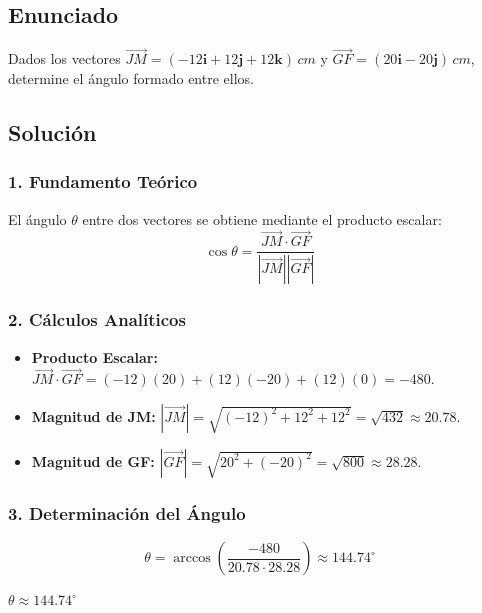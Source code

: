 \documentclass[12pt, a4paper]{article}
\begin{document}
\newpage

\subsection*{Enunciado}
Dados los vectores $\vec{JM} = (-12\mathbf{i} + 12\mathbf{j} + 12\mathbf{k}) \, \si{cm}$ y $\vec{GF} = (20\mathbf{i} - 20\mathbf{j}) \, \si{cm}$, determine el ángulo formado entre ellos.

\subsection*{Solución}

\subsubsection*{1. Fundamento Teórico}
El ángulo $\theta$ entre dos vectores se obtiene mediante el producto escalar:
\begin{equation*}
    \cos \theta = \frac{\vec{JM} \cdot \vec{GF}}{|\vec{JM}| |\vec{GF}|}
\end{equation*}

\subsubsection*{2. Cálculos Analíticos}
\begin{itemize}
    \item \textbf{Producto Escalar:} $\vec{JM} \cdot \vec{GF} = (-12)(20) + (12)(-20) + (12)(0) = -480$.
    \item \textbf{Magnitud de JM:} $|\vec{JM}| = \sqrt{(-12)^2 + 12^2 + 12^2} = \sqrt{432} \approx 20.78$.
    \item \textbf{Magnitud de GF:} $|\vec{GF}| = \sqrt{20^2 + (-20)^2} = \sqrt{800} \approx 28.28$.
\end{itemize}

\subsubsection*{3. Determinación del Ángulo}
\begin{equation*}
    \theta = \arccos\left( \frac{-480}{20.78 \cdot 28.28} \right) \approx 144.74^\circ \text{}
\end{equation*}

\begin{tcolorbox}[colback=green!5, colframe=green!50!black, title=Respuesta Final]
\centering \Large $\theta \approx 144.74^\circ$
\end{tcolorbox}
\end{document}

